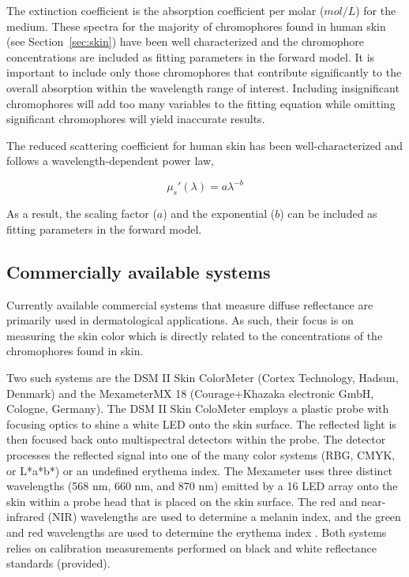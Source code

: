 The extinction coefficient is the absorption coefficient per molar ($mol/L$) for the medium. These spectra for the majority of chromophores found in human skin (see Section~\ref{sec:skin}) have been well characterized and the chromophore concentrations are included as fitting parameters in the forward model. It is important to include only those chromophores that contribute significantly to the overall absorption within the wavelength range of interest. Including insignificant chromophores will add too many variables to the fitting equation while omitting significant chromophores will yield inaccurate results.

The reduced scattering coefficient for human skin has been well-characterized and follows a wavelength-dependent power law,\cite{Doornbos1999}

\begin{equation}
\mu_s'(\lambda) = a\lambda^{-b}
\end{equation}

As a result, the scaling factor ($a$) and the exponential ($b$) can be included as fitting parameters in the forward model.

\subsection{Commercially available systems}
Currently available commercial systems that measure diffuse reflectance are primarily used in dermatological applications. As such, their focus is on measuring the skin color which is directly related to the concentrations of the chromophores found in skin.

Two such systems are the DSM II Skin ColorMeter (Cortex Technology, Hadsun, Denmark) and the Mexameter\textregistered MX 18 (Courage+Khazaka electronic GmbH, Cologne, Germany). The DSM II Skin ColoMeter employs a plastic probe with focusing optics to shine a white LED onto the skin surface. The reflected light is then focused back onto multispectral detectors within the probe. The detector processes the reflected signal into one of the many color systems (RBG, CMYK, or L*a*b*) or an undefined erythema index. The Mexameter uses three distinct wavelengths (568 nm, 660 nm, and 870 nm) emitted by a 16 LED array onto the skin within a probe head that is placed on the skin surface. The red and near-infrared (NIR) wavelengths are used to determine a melanin index, and the green and red wavelengths are used to determine the erythema index .\cite{Clarys2000} Both systems relies on calibration measurements performed on black and white reflectance standards (provided).

